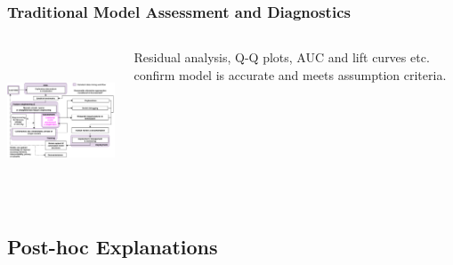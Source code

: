 \documentclass[11pt,
               aspectratio=169,
               hyperref={colorlinks}
               ]{beamer}
\begin{document}
			\begin{frame}
		
				\frametitle{Traditional Model Assessment and Diagnostics}		
			
				\begin{columns}			
			
					\centering
					\includegraphics[height=120pt]{img/ma.png}
				
					\vspace{-5pt}
					
					Residual analysis, Q-Q plots, AUC and lift curves etc. confirm model is accurate and meets assumption criteria.
					
				\end{columns}
		
			\end{frame}

		\subsection{Post-hoc Explanations}
			
\end{document}
